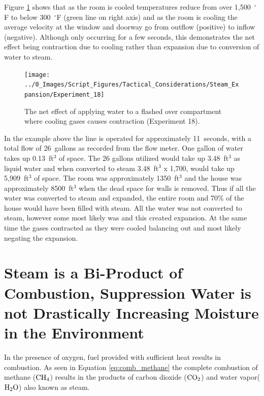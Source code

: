 \documentclass[12pt,oneside]{book}
\begin{document}
Figure \ref{fig:expansion_TC_chart} shows that as the room is cooled temperatures reduce from over 1,500~$^\circ$F to below 300~$^\circ$F (green line on right axis) and as the room is cooling the average velocity at the window and doorway go from outflow (positive) to inflow (negative). Although only occurring for a few seconds, this demonstrates the net effect being contraction due to cooling rather than expansion due to conversion of water to steam. 

\begin{figure}[H]
\centering
\texttt{[image: ../0\_Images/Script\_Figures/Tactical\_Considerations/Steam\_Expansion/Experiment\_18]}
\caption[Gas Contraction Due to Cooling - Exterior Attack]{The net effect of applying water to a flashed over compartment where cooling gases causes contraction (Experiment 18).}
\label{fig:expansion_TC_chart}
\end{figure}

In the example above the line is operated for approximately 11~seconds, with a total flow of 26~gallons as recorded from the flow meter. One gallon of water takes up 0.13~ft$^3$ of space. The 26 gallons utilized would take up 3.48~ft$^3$ as liquid water and when converted to steam 3.48~ft$^3$ x 1,700, would take up 5,909~ft$^3$ of space. The room was approximately 1350~ft$^3$ and the house was approximately 8500~ft$^3$ when the dead space for walls is removed. Thus if all the water was converted to steam and expanded, the entire room and 70\% of the house would have been filled with steam. All the water was not converted to steam, however some most likely was and this created expansion. At the same time the gases contracted as they were cooled balancing out and most likely negating the expansion. 

\section[Steam is a bi-product of combustion]{Steam is a Bi-Product of Combustion, Suppression Water is not Drastically Increasing Moisture in the Environment} \label{tc:steam_is_biproduct_of_combustion}


In the presence of oxygen, fuel provided with sufficient heat results in combustion. As seen in Equation \ref{eq:comb_methane} the complete combustion of methane ($\ce{CH4}$) results in the products of carbon dioxide ($\ce{CO2}$) and water vapor($\ce{H2O}$) also known as steam. 
\end{document}
